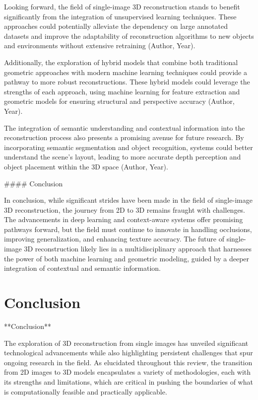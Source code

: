 \documentclass[conference]{IEEEtran}
\begin{document}
Looking forward, the field of single-image 3D reconstruction stands to benefit significantly from the integration of unsupervised learning techniques. These approaches could potentially alleviate the dependency on large annotated datasets and improve the adaptability of reconstruction algorithms to new objects and environments without extensive retraining (Author, Year).

Additionally, the exploration of hybrid models that combine both traditional geometric approaches with modern machine learning techniques could provide a pathway to more robust reconstructions. These hybrid models could leverage the strengths of each approach, using machine learning for feature extraction and geometric models for ensuring structural and perspective accuracy (Author, Year).

The integration of semantic understanding and contextual information into the reconstruction process also presents a promising avenue for future research. By incorporating semantic segmentation and object recognition, systems could better understand the scene's layout, leading to more accurate depth perception and object placement within the 3D space (Author, Year).

#### Conclusion

In conclusion, while significant strides have been made in the field of single-image 3D reconstruction, the journey from 2D to 3D remains fraught with challenges. The advancements in deep learning and context-aware systems offer promising pathways forward, but the field must continue to innovate in handling occlusions, improving generalization, and enhancing texture accuracy. The future of single-image 3D reconstruction likely lies in a multidisciplinary approach that harnesses the power of both machine learning and geometric modeling, guided by a deeper integration of contextual and semantic information.

\section{Conclusion}

**Conclusion**

The exploration of 3D reconstruction from single images has unveiled significant technological advancements while also highlighting persistent challenges that spur ongoing research in the field. As elucidated throughout this review, the transition from 2D images to 3D models encapsulates a variety of methodologies, each with its strengths and limitations, which are critical in pushing the boundaries of what is computationally feasible and practically applicable.
\end{document}
